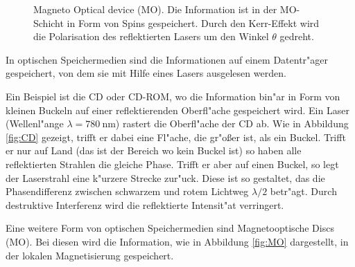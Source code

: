 \begin{figure}[htpb]
\begin{minipage}[t][][t]{0.48\textwidth}
        \caption{
            Magneto Optical device (MO).
            Die Information ist in der MO-Schicht in Form von Spins gespeichert.
            Durch den Kerr-Effekt wird die Polarisation des reflektierten Lasers um den Winkel $\theta$ gedreht.
        }
        \label{fig:MO}
    \end{minipage}
\end{figure}
In optischen Speichermedien sind die Informationen auf einem Datentr"ager gespeichert, von dem sie mit Hilfe eines Lasers ausgelesen werden.

Ein Beispiel ist die CD oder CD-ROM, wo die Information bin"ar in Form von kleinen Buckeln auf einer reflektierenden Oberfl"ache gespeichert wird.
Ein Laser (Wellenl"ange $\lambda=\SI{780}{\nano\metre}$) rastert die Oberfl"ache der CD ab.
Wie in Abbildung \vref{fig:CD} gezeigt, trifft er dabei eine Fl"ache, die gr"o{\ss}er ist, als ein Buckel.
Trifft er nur auf Land (das ist der Bereich wo kein Buckel ist) so haben alle reflektierten Strahlen die gleiche Phase.
Trifft er aber auf einen Buckel, so legt der Laserstrahl eine k"urzere Strecke zur"uck.
Diese ist so gestaltet, das die Phasendifferenz zwischen schwarzem und rotem Lichtweg $\lambda/2$ betr"agt.
Durch destruktive Interferenz wird die reflektierte Intensit"at verringert. \cite{wikicd}

Eine weitere Form von optischen Speichermedien sind Magnetooptische Discs (MO).
Bei diesen wird die Information, wie in Abbildung \vref{fig:MO} dargestellt, in der lokalen Magnetisierung gespeichert.
\cite{roll}


